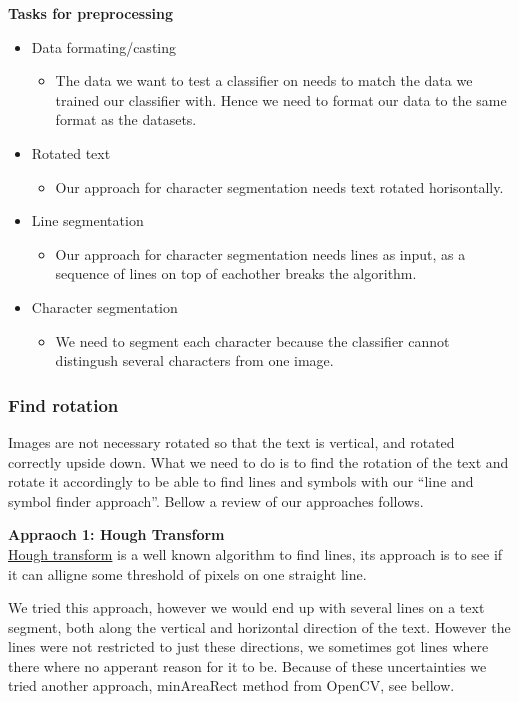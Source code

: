 \documentclass[11pt,a4paper,UKenglish]{article}
\begin{document}
\begin{flushleft}
  \textbf{Tasks for preprocessing}
  \begin{itemize}
    \item{Data formating/casting}
    \begin{itemize}
      \item{The data we want to test a classifier on needs to match the data we trained our classifier with. Hence we need to format our data to the same format as the datasets.}
    \end{itemize}
    \item{Rotated text}
    \begin{itemize}
      \item{Our approach for character segmentation needs text rotated horisontally.}
    \end{itemize}
      \item{Line segmentation}
    \begin{itemize}
      \item{Our approach for character segmentation needs lines as input, as a sequence of lines on top of eachother breaks the algorithm.}
    \end{itemize}
      \item{Character segmentation}
    \begin{itemize}
      \item{We need to segment each character because the classifier cannot distingush several characters from one image.}
    \end{itemize}
  \end{itemize}
\end{flushleft}


\subsubsection{Find rotation}
Images are not necessary rotated so that the text is vertical, and rotated
correctly upside down. What we need to do is to find the rotation of the text
and rotate it accordingly to be able to find lines and symbols with our
``line and symbol finder approach''. Bellow a review of our approaches follows.

\begin{flushleft}
  \textbf{Appraoch 1: Hough Transform} \\
  \href{https://en.wikipedia.org/wiki/Hough_transform}{Hough transform} is a well known algorithm to find lines, its
  approach is to see if it can alligne some threshold of pixels on one straight
  line. \par
  We tried this approach, however we would end up with several lines on a text
  segment, both along the vertical and horizontal direction of the text. However
  the lines were not restricted to just these directions, we sometimes got lines
  where there where no apperant reason for it to be. Because of these
  uncertainties we tried another approach, minAreaRect method from OpenCV, see
  bellow.
\end{flushleft}
\end{document}
